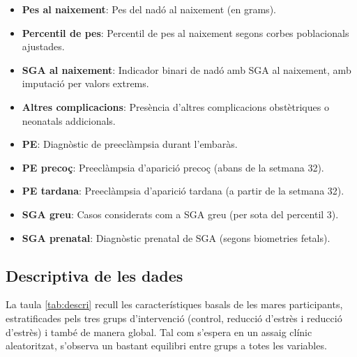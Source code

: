 \documentclass[../main.tex]{subfiles}
\begin{document}
    {\small
    \begin{itemize}
        \item \textbf{Pes al naixement}: Pes del nadó al naixement (en grams).
        \item \textbf{Percentil de pes}: Percentil de pes al naixement segons corbes poblacionals ajustades.
        \item \textbf{SGA al naixement}: Indicador binari de nadó amb SGA al naixement, amb imputació per valors extrems.
        \item \textbf{Altres complicacions}: Presència d’altres complicacions obstètriques o neonatals addicionals.
        \item \textbf{PE}: Diagnòstic de preeclàmpsia durant l’embaràs.
        \item \textbf{PE precoç}: Preeclàmpsia d’aparició precoç (abans de la setmana 32).
        \item \textbf{PE tardana}: Preeclàmpsia d’aparició tardana (a partir de la setmana 32).
        \item \textbf{SGA greu}: Casos considerats com a SGA greu (per sota del percentil 3).
        \item \textbf{SGA prenatal}: Diagnòstic prenatal de SGA (segons biometries fetals).
    \end{itemize}
    }

    \subsection{Descriptiva de les dades}\label{subsec:descriptiva}
    
    La taula \ref{tab:descri} recull les característiques basals de les mares participants, estratificades pels tres grups d’intervenció (control, reducció d’estrès i reducció d'estrès) i també de manera global. Tal com s’espera en un assaig clínic aleatoritzat, s’observa un bastant equilibri entre grups a totes les variables.
\end{document}
